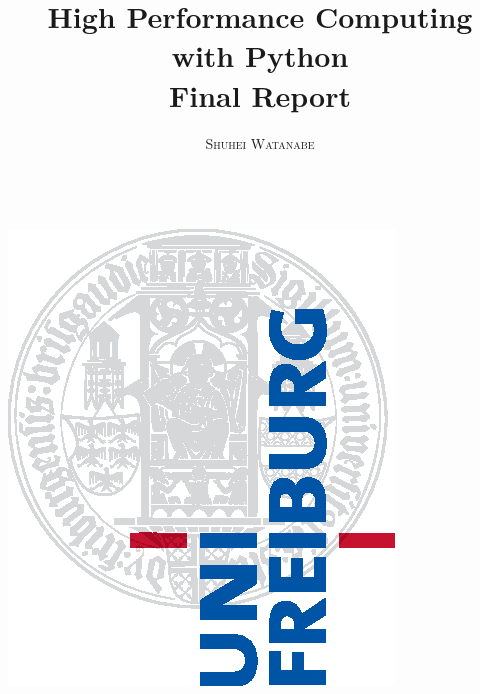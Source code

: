 \documentclass[a4paper,11pt]{report}
\title{\Huge \textbf{High Performance Computing \\ with Python} \vspace{4mm} \\ \huge Final Report}
\author{\textsc{Shuhei Watanabe} \\ \vspace{3mm}\text{5171091}  \\
\vspace{3mm}\text{watanabs@informatik.uni-freiburg.de}}
\renewcommand{\_}{{\tiny \textunderscore}}
\begin{document}
\makeatletter
    \begin{titlepage}
        \begin{center}
            \includegraphics[width=0.5\linewidth]{logos/Uni_Logo-Grundversion_E1_A4_CMYK.eps}\\[4ex]
            {\huge \bfseries  \@title }\\[2ex] 
            {\LARGE  \@author}\\[30ex] 
            {\large \@date}
        \end{center}
    \end{titlepage}
\makeatother
\thispagestyle{empty}
\newpage

\tableofcontents

\end{document}
